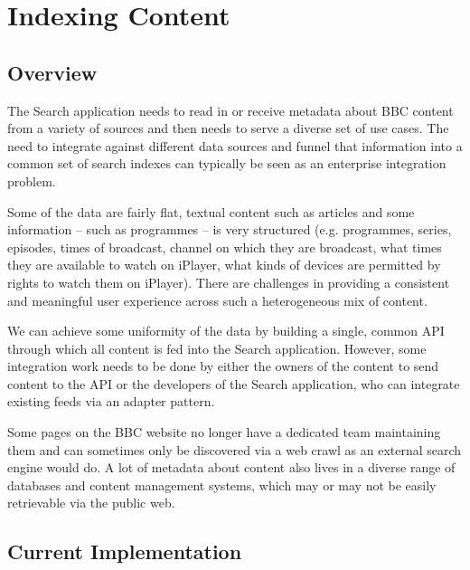 \section{Indexing Content}

\subsection{Overview}

The Search application needs to read in or receive metadata about
BBC content from a variety of sources and then needs to serve
a diverse set of use cases.\cite{fenning2014applicability} The
need to integrate against different data sources and funnel
that information into a common set of search indexes can
typically be seen as an enterprise integration
problem.

Some of the data are fairly flat, textual content such as articles and some
information -- such as programmes -- is very structured (e.g. programmes,
series, episodes, times of broadcast, channel on which they are broadcast,
what times they are available to watch on iPlayer, what kinds of devices
are permitted by rights to watch them on iPlayer). There are challenges
in providing a consistent and meaningful user experience across such
a heterogeneous mix of content.

We can achieve some uniformity of the data by building a single, common
API through which all content is fed into the Search application. However,
some integration work needs to be
done by either the owners of the content to send content to the API
or the developers of the Search application, who can integrate
existing feeds via an adapter pattern.

Some pages on the BBC website no
longer have a dedicated team maintaining them and can sometimes only
be discovered via a web crawl as an external search engine would do. A lot
of metadata about content also lives in a diverse range of databases and
content management systems, which may or may not be easily retrievable
via the public web.

\subsection{Current Implementation}
\label{sec:current-impl}

